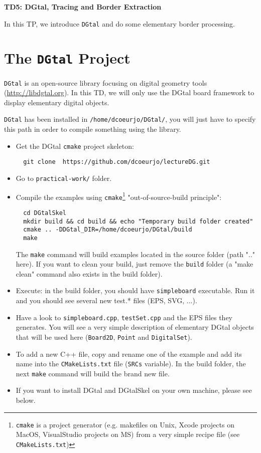 \documentclass[a4paper, 11pt]{article}
\title{}
\author{}
\date{}
\begin{document}
\begin{center}
	\LARGE \textbf{TD5: DGtal, Tracing and Border Extraction}
\end{center}

\bigskip
\par In this TP, we introduce \texttt{DGtal} and do some elementary border processing.

\section*{The \texttt{DGtal} Project}

\par \texttt{DGtal} is an open-source library focusing on digital geometry tools (\url{http://libdgtal.org}). In this TD, we will only use the DGtal board framework to display elementary digital objects.

\par \texttt{DGtal} has been installed in \texttt{/home/dcoeurjo/DGtal/}, you will just have to specify this path in order to compile something using the library.
\begin{itemize}
	\item Get the DGtal \texttt{cmake} project skeleton:
\begin{verbatim}
  git clone  https://github.com/dcoeurjo/lectureDG.git
\end{verbatim}
\item Go to \texttt{practical-work/} folder.
	\item Compile the examples using \texttt{cmake}\footnote{\texttt{cmake} is a project generator (e.g. makefiles on Unix, Xcode projects on MacOS, VisualStudio projects on MS) from a very simple recipe file (see \texttt{CMakeLists.txt})} "out-of-source-build principle":
\begin{verbatim}
  cd DGtalSkel
  mkdir build && cd build && echo "Temporary build folder created"
  cmake .. -DDGtal_DIR=/home/dcoeurjo/DGtal/build
  make
\end{verbatim}
	The \texttt{make} command will build examples located in the source folder (path ".." here). If you want to clean your build, just remove the \texttt{build} folder (a "make clean" command also exists in the build folder).
	\item Execute: in the build folder, you should have \texttt{simpleboard} executable. Run it and you should see several new test.* files (EPS, SVG, ...).
	\item Have a look to  \texttt{simpleboard.cpp}, \texttt{testSet.cpp} and the EPS files they generates. You will see a very simple description of elementary DGtal objects that will be used here (\texttt{Board2D}, \texttt{Point} and \texttt{DigitalSet}).
	\item To add a new C++ file, copy and rename one of the example and add its name into the \texttt{CMakeLists.txt} file (\texttt{SRCs} variable). In the build folder, the next \texttt{make} command will build the brand new file.
	\item If you want to install DGtal and DGtalSkel on your own machine, please see below.
\end{itemize}
\end{document}
